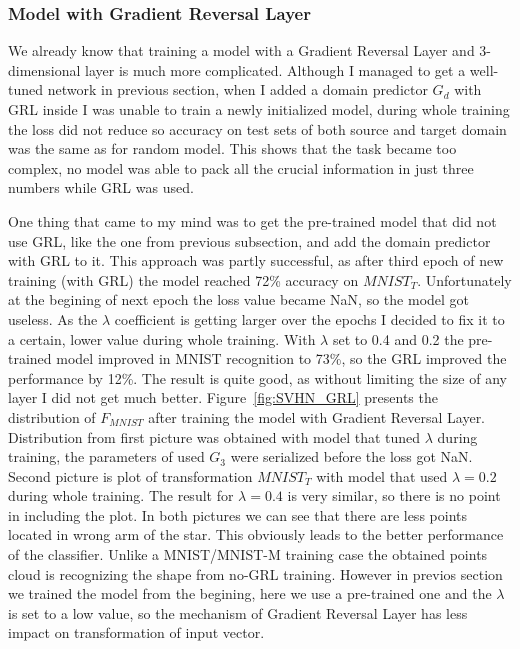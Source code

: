 \documentclass{article}
\begin{document}
\subsubsection{Model with Gradient Reversal Layer}
\par
We already know that training a model with a Gradient Reversal Layer and 3-dimensional layer is much more complicated. Although I managed to get a well-tuned network in previous section, when I added a domain predictor $G_{d}$ with GRL inside I was unable to train a newly initialized model, during whole training the loss did not reduce so accuracy on test sets of both source and target domain was the same as for random model. This shows that the task became too complex, no model was able to pack all the crucial information in just three numbers while GRL was used. 
\par
One thing that came to my mind was to get the pre-trained model that did not use GRL, like the one from previous subsection, and add the domain predictor with GRL to it. This approach was partly successful, as after third epoch of new training (with GRL) the model reached 72\% accuracy on $MNIST_{T}$. Unfortunately at the begining of next epoch the loss value became NaN, so the model got useless. As the $\lambda$ coefficient is getting larger over the epochs I decided to fix it to a certain, lower value during whole training. With $\lambda$ set to 0.4 and 0.2 the pre-trained model improved in MNIST recognition to 73\%, so the GRL improved the performance by 12\%. The result is quite good, as without limiting the size of any layer I did not get much better. Figure~\ref{fig:SVHN_GRL} presents the distribution of $F_{MNIST}$ after training the model with Gradient Reversal Layer. Distribution from first picture was obtained with model that tuned $\lambda$ during training, the parameters of used $G_{3}$ were serialized before the loss got NaN. Second picture is plot of transformation $MNIST_{T}$ with model that used $\lambda = 0.2$ during whole training. The result for $\lambda = 0.4$ is very similar, so there is no point in including the plot. In both pictures we can see that there are less points located in wrong arm of the star. This obviously leads to the better performance of the classifier. Unlike a MNIST/MNIST-M training case the obtained points cloud is recognizing the shape from no-GRL training. However in previos section we trained the model from the begining, here we use a pre-trained one and the $\lambda$ is set to a low value, so the mechanism of Gradient Reversal Layer has less impact on transformation of input vector.
\end{document}

